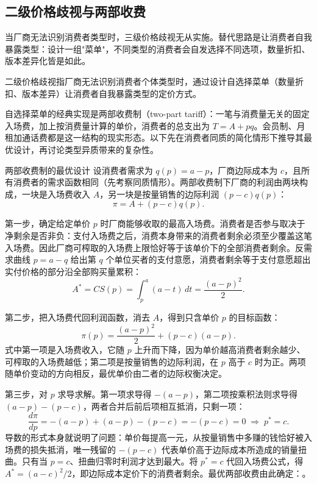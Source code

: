 \subsection{二级价格歧视与两部收费}

当厂商无法识别消费者类型时，三级价格歧视无从实施。替代思路是让消费者自我暴露类型：设计一组"菜单"，不同类型的消费者会自发选择不同选项，数量折扣、版本差异化皆是如此。

\begin{definition}
二级价格歧视指厂商无法识别消费者个体类型时，通过设计自选择菜单（数量折扣、版本差异）让消费者自我暴露类型的定价方式。
\end{definition}

自选择菜单的经典实现是两部收费制（two-part tariff）：一笔与消费量无关的固定入场费，加上按消费量计算的单价，消费者的总支出为 $T = A + pq$。会员制、月租加通话费都是这一结构的现实形态。以下先在消费者同质的简化情形下推导其最优设计，再讨论类型异质带来的复杂性。

\begin{derivation}{两部收费制的最优设计}{}
设消费者需求为 $q(p) = a - p$，厂商边际成本为 $c$，且所有消费者的需求函数相同（先考察同质情形）。两部收费制下厂商的利润由两块构成，一块是入场费收入 $A$，另一块是按量销售的边际利润 $(p-c)q(p)$：
\[
\pi = A + (p - c) q(p).
\]

第一步，确定给定单价 $p$ 时厂商能够收取的最高入场费。消费者是否参与取决于净剩余是否非负：支付入场费之后，消费本身带来的消费者剩余必须至少覆盖这笔入场费。因此厂商可榨取的入场费上限恰好等于该单价下的全部消费者剩余。反需求曲线 $p = a - q$ 给出第 $q$ 个单位买者的支付意愿，消费者剩余等于支付意愿超出实付价格的部分沿全部购买量累积：
\[
A^* = CS(p) = \int_p^a (a - t)\, dt = \frac{(a-p)^2}{2}.
\]

第二步，把入场费代回利润函数，消去 $A$，得到只含单价 $p$ 的目标函数：
\[
\pi(p) = \frac{(a-p)^2}{2} + (p-c)(a-p).
\]
式中第一项是入场费收入，它随 $p$ 上升而下降，因为单价越高消费者剩余越少、可榨取的入场费越低；第二项是按量销售的边际利润，在 $p$ 高于 $c$ 时为正。两项随单价变动的方向相反，最优单价由二者的边际权衡决定。

第三步，对 $p$ 求导求解。第一项求导得 $-(a-p)$，第二项按乘积法则求导得 $(a-p)-(p-c)$，两者合并后前后项相互抵消，只剩一项：
\[
\frac{d\pi}{dp} = -(a-p) + (a-p) - (p-c) = -(p-c) = 0 \;\Rightarrow\; p^* = c.
\]
导数的形式本身就说明了问题：单价每提高一元，从按量销售中多赚的钱恰好被入场费的损失抵消，唯一残留的 $-(p-c)$ 代表单价高于边际成本所造成的销量扭曲。只有当 $p = c$、扭曲归零时利润才达到最大。将 $p^*=c$ 代回入场费公式，得 $A^* = (a-c)^2/2$，即边际成本定价下的消费者剩余。最优两部收费由此确定：。
\end{derivation}

